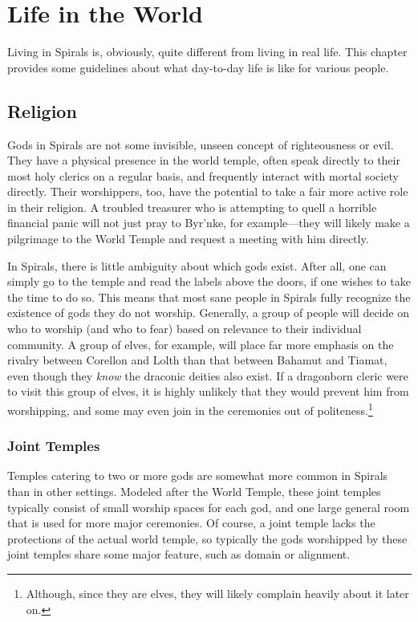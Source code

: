 \chapter{Life in the World}
Living in Spirals is, obviously, quite different from living in real life.
This chapter provides some guidelines about what day-to-day life is like for various people.


\begin{multicols}{2}
\section{Religion}
Gods in Spirals are not some invisible, unseen concept of righteousness or evil.
They have a physical presence in the world temple, often speak directly to their most holy clerics on a regular basis, and frequently interact with mortal society directly.
Their worshippers, too, have the potential to take a fair more active role in their religion.
A troubled treasurer who is attempting to quell a horrible financial panic will not just pray to Byr’nke, for example---they will likely make a pilgrimage to the World Temple and request a meeting with him directly.

In Spirals, there is little ambiguity about which gods exist.
After all, one can simply go to the temple and read the labels above the doors, if one wishes to take the time to do so.
This means that most sane people in Spirals fully recognize the existence of gods they do not worship.
Generally, a group of people will decide on who to worship (and who to fear) based on relevance to their individual community.
A group of elves, for example, will place far more emphasis on the rivalry between Corellon and Lolth than that between Bahamut and Tiamat, even though they \textit{know} the draconic deities also exist.
If a dragonborn cleric were to visit this group of elves, it is highly unlikely that they would prevent him from worshipping, and some may even join in the ceremonies out of politeness.\footnote{Although, since they are elves, they will likely complain heavily about it later on.}

\subsection{Joint Temples}
Temples catering to two or more gods are somewhat more common in Spirals than in other settings.
Modeled after the World Temple, these joint temples typically consist of small worship spaces for each god, and one large general room that is used for more major ceremonies.
Of course, a joint temple lacks the protections of the actual world temple, so typically the gods worshipped by these joint temples share some major feature, such as domain or alignment.


\end{multicols}
